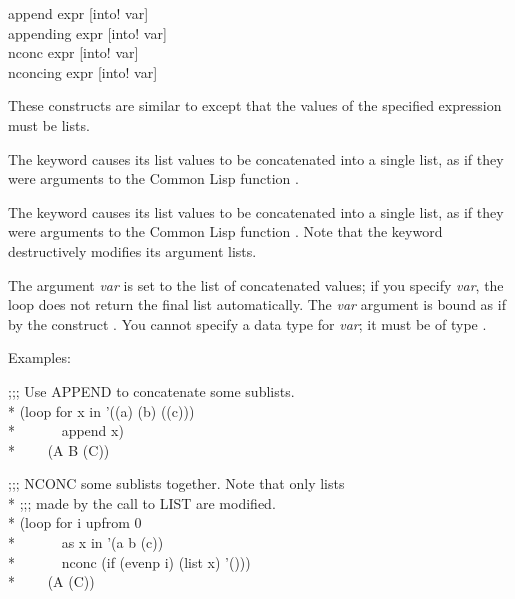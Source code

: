 \begin{defloop}
append expr [\!into! var] \\
appending expr [\!into! var] \\
nconc expr [\!into! var] \\
nconcing expr [\!into! var]

These constructs are similar to  except that the
values of the specified expression must be lists.  

The  keyword causes its list values to be concatenated 
into a single list, as if 
they were arguments to the Common Lisp function .

The  keyword causes its list values to be concatenated
into a single list,
as if they were arguments to the Common Lisp function .  
Note that the  keyword destructively modifies its argument lists.

The argument \emph{var\/} is 
set to the list of concatenated values; if you specify \emph{var}, the loop
does not return the final list automatically.  The \emph{var\/} argument
is bound as if by the construct .
You cannot specify a data type for \emph{var\/}; it must be of type .


Examples:
\begin{lisp}
;;; Use APPEND to concatenate some sublists. \\*
(loop for x in '((a) (b) ((c))) \\*
~~~~~~append x) \\*
~~~\EV~(A B (C))
\end{lisp}
\begin{lisp}
;;; NCONC some sublists together.  Note that only lists \\*
;;; made by the call to LIST are modified. \\*
(loop for i upfrom 0  \\*
~~~~~~as x in '(a b (c)) \\*
~~~~~~nconc (if (evenp i) (list x) '())) \\*
~~~\EV~(A (C))
\end{lisp}
\end{defloop}


